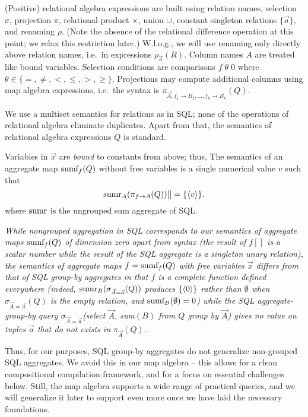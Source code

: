 (Positive) relational algebra expressions are built using relation names,
selection $\sigma$, projection $\pi$, relational product $\times$, union $\cup$,
constant singleton relations $\{\vec{a}\}$,
and renaming $\rho$.
(Note the absence of the relational difference operation at this point; we
relax this restriction later.)
W.l.o.g., we will use renaming only directly above relation names, i.e.\ in expressions
$\rho_{\vec{a}}(R)$.
Column names $A$ are treated like bound variables.
Selection conditions are comparisons
$f \;\theta\; 0$ where $\theta \in \{ =, \neq, <, \le, >, \ge \}$.
Projections may compute additional columns
using map algebra expressions, i.e.\ the syntax is
$\pi_{\vec{A}, f_1 \rightarrow B_1, \dots, f_k \rightarrow B_k}(Q)$. 

We use a multiset semantics for relations as in SQL; none of the operations
of relational algebra eliminate duplicates.
Apart from that, the semantics of relational algebra expressions $Q$ is standard.

Variables
in $\vec{x}$ are {\em bound}\/ to constants from above; thus, 
The semantics of an
aggregate map $\mbox{sumf}_f(Q)$ without free variables
is a single numerical value $v$ such that
\[
\mbox{sumr}_A(\pi_{f \rightarrow A}(Q))[] = \{ {\langle v\rangle} \}.
\]
where $\mbox{sumr}$ is the ungrouped sum aggregate of SQL.


\begin{remark}\em
While nongrouped aggregation in SQL corresponds to our semantics of aggregate
maps $\mbox{sumf}_f(Q)$ of dimension zero apart from syntax (the result of $f[]$ is a scalar number
while the result of the SQL aggregate is a singleton unary relation),
the semantics of aggregate maps $f = \mbox{sumf}_f(Q)$ with
free variables $\vec{x}$ differs from that
of SQL group-by aggregates in that $f$ is a complete function defined everywhere
(indeed, $\mbox{sumr}_B(\sigma_{\vec{A}=\vec{a}}(Q))$ produces $\{{\langle0\rangle}\}$ rather
than $\emptyset$ when $\sigma_{\vec{A}=\vec{a}}(Q)$ is the empty relation, and
$\mbox{sumf}_B(\emptyset) = 0$) while
the SQL aggregate-group-by query
$\sigma_{\vec{A}=\vec{a}}$(select $\vec{A}$, sum$(B)$ from $Q$ group by $\vec{A}$)
gives no value on tuples $\vec{a}$ that do not exists in $\pi_{\vec{A}}(Q)$.

Thus, for our purposes, SQL group-by aggregates do not generalize non-grouped
SQL aggregates. We avoid this in our map algebra -- this allows for a clean
compositional compilation framework, and for a focus on essential challenges
below. Still, the map algebra supports a wide range of practical queries, and we will
generalize it later to support even more once we have laid the necessary foundations.
\end{remark}


